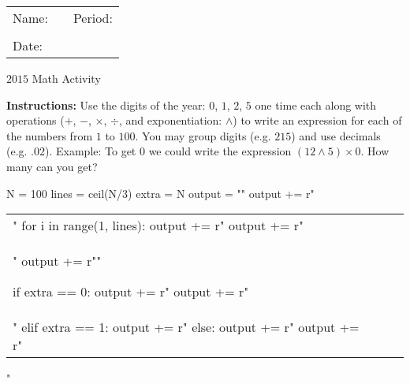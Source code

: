 \documentclass{article}
\begin{document}
\fontsize{15pt}{17pt}\selectfont %
\noindent
\begin{tabular}{@{}l p{1.6in}r @{}}
Name: \vrule height 0 pt depth 0.4 pt width 3.0 in & & Period: \vrule height 0 pt depth 0.4 pt width .75 in \\\\
Date: \vrule height 0 pt depth 0.4 pt width 1.0 in
\end{tabular}
\begin{center}
{\LARGE $2015$ Math Activity}
\end{center}
\noindent \textbf{Instructions: }Use the digits of the year: $0$,
$1$, $2$, $5$ one time each along with operations ($+$, 
$-$, $\times$, $\div$, and exponentiation: $\wedge$) 
to write an expression for each of the numbers from $1$ to $100$. You 
may group digits (e.g. $215$) and use decimals (e.g. $.02$). 
Example: To get $0$ we could write the expression $(12\wedge 5)\times 0$. 
How many can you get?
\begin{sagesilent}
N = 100
lines = ceil(N/3)
extra = N%
output = ""
output += r"\begin{supertabular}{p{5.5cm}|p{5.5cm}|p{5.5cm}}"
for i in range(1, lines):
    output += r"%
    output += r" &  & \\ "
    output += r"\hline "
    
if extra == 0:
    output += r"%
    output += r" &  & \\ "
elif extra == 1:
    output += r"%
else:
    output += r"%
output += r"\end{supertabular}"
\end{sagesilent}
\begin{center}
\end{center}
\end{document}

